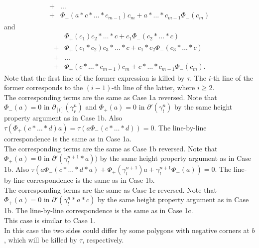 \documentclass[11pt]{amsart}
\makeatletter
\renewenvironment{proof}[1][\proofname] {\par\pushQED{\qed}{\normalfont\bfseries\topsep6\p@\@plus6\p@\relax #1\@addpunct{.} }}{\popQED\endtrivlist\@endpefalse}
\theoremstyle{mystyle}
\newcommand{\<}{\langle}
\renewcommand{\>}{\rangle}
\makeatother
\begin{document}
\begin{proof}
\begin{align*}
        +& \ldots \\
        +& \Phi_+(a * c * \dots  * c_{m-1}) c_m + a * \dots  * c_{m-1} \Phi_-(c_m)
    \end{align*} and \begin{align*}
        & \Phi_+(c_1) c_2 * \dots  * c + c_1 \Phi_-(c_2 * \dots  * c) \\
        +& \Phi_+(c_1 * c_2) c_3 * \dots  * c + c_1 * c_2 \Phi_-(c_3 * \dots  * c) \\
        +& \ldots \\
        +& \Phi_+(c * \dots  * c_{m-1}) c_m + c * \dots  * c_{m-1} \Phi_-(c_m).
    \end{align*} Note that the first line of the former expression is killed by $\tau$. The $i$-th line of the former corresponds to the $(i-1)$-th line of the latter, where $i \geq 2$. \\

 The corresponding terms are the same as Case 1a reversed. Note that $\Phi_-(a) = 0$ in $\partial_{[l]}(\gamma_r^n)$ and $\Phi_+(a) = 0$ in $\partial'(\gamma_l^n)$ by the same height property argument as in Case 1b. Also $\tau(\Phi_+(c * \dots  * d)a) = \tau(a \Phi_-(c * \dots  * d)) = 0$. The line-by-line correspondence is the same as in Case 1a. \\

     The corresponding terms are the same as Case 1b reversed. Note that $\Phi_+(a) = 0$ in $\partial'(\gamma_l^{n+1} * a))$ by the same height property argument as in Case 1b. Also $\tau(a \Phi_-(c * \dots  * d * a) + \Phi_+(\gamma_l^{n+1})a + \gamma_l^{n+1} \Phi_-(a)) = 0$. The line-by-line correspondence is the same as in Case 1b. \\

     The corresponding terms are the same as Case 1c reversed. Note that $\Phi_+(a) = 0$ in $\partial'(\gamma^n_l * a * c)$ by the same height property argument as in Case 1b. The line-by-line correspondence is the same as in Case 1c. \\
     This case is similar to Case 1. \\
    
     In this case the two sides could differ by some polygons with negative corners at $b$, which will be killed by $\tau$, respectively.
\end{proof}
\end{document}
